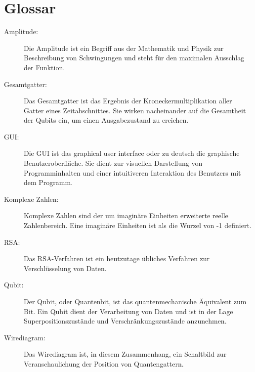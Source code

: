 \documentclass[12pt]{report}
\begin{document}
\chapter*{Glossar}
\begin{description}

\item[Amplitude:]
Die Amplitude ist ein Begriff aus der Mathematik und Physik zur Beschreibung von Schwingungen und steht für den maximalen Ausschlag der Funktion.

\item [Gesamtgatter:] Das Gesamtgatter ist das Ergebnis der Kroneckermultiplikation aller Gatter eines Zeitabschnittes.
Sie wirken nacheinander auf die Gesamtheit der Qubits ein, um einen Ausgabezustand zu ereichen.

\item[GUI:]
Die GUI ist das \glqq graphical user interface\grqq{} oder zu deutsch die \glqq graphische Benutzeroberfläche\grqq.
Sie dient zur visuellen Darstellung von Programminhalten und einer intuitiveren Interaktion des Benutzers mit dem Programm.

\item[Komplexe Zahlen:]
Komplexe Zahlen sind der um imaginäre Einheiten erweiterte reelle Zahlenbereich.
Eine imaginäre Einheiten ist als die Wurzel von -1 definiert.

\item[RSA:]
Das RSA-Verfahren ist ein heutzutage übliches Verfahren zur Verschlüsselung von Daten.

\item[Qubit:]
Der Qubit, oder Quantenbit, ist das quantenmechanische Äquivalent zum Bit. Ein Qubit dient der Verarbeitung von Daten und ist in der Lage Superpositionszustände und Verschränkungszustände anzunehmen.

\item[Wirediagram:]
Das Wirediagram ist, in diesem Zusammenhang, ein Schaltbild zur Veranschaulichung der Position von Quantengattern.

\end{description}

\newpage
{}
\listoffigures
\newpage
\end{document}

